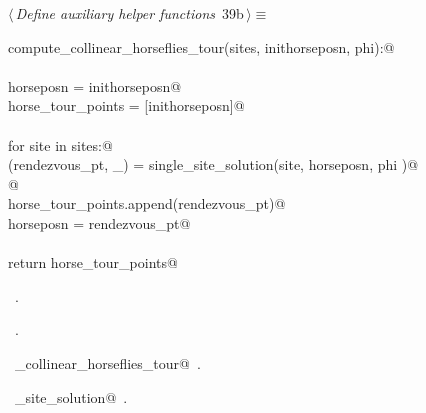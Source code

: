 \documentclass[11.5pt]{report}
\begin{document}

\begin{flushleft} \small
\begin{minipage}{\linewidth}\label{scrap53}\raggedright\small
{} $\langle\,${\itshape Define auxiliary helper functions}\nobreak\ {\footnotesize {39b}}$\,\rangle\equiv$
\vspace{-1ex}
\begin{list}{}{} \item
\mbox{}\verb@def compute_collinear_horseflies_tour(sites, inithorseposn, phi):@\\
\mbox{}\verb@@\\
\mbox{}\verb@      horseposn         = inithorseposn@\\
\mbox{}\verb@      horse_tour_points = [inithorseposn]@\\
\mbox{}\verb@@\\
\mbox{}\verb@      for site in sites:@\\
\mbox{}\verb@          (rendezvous_pt, _) = single_site_solution(site, horseposn, phi )@\\
\mbox{}\verb@            @\\
\mbox{}\verb@          horse_tour_points.append(rendezvous_pt)@\\
\mbox{}\verb@          horseposn = rendezvous_pt@\\
\mbox{}\verb@@\\
\mbox{}\verb@      return horse_tour_points@\\
\mbox{}\verb@@{\NWsep}
\end{list}
\vspace{-1.5ex}
\footnotesize
\begin{list}{}{\setlength{\itemsep}{-\parsep}\setlength{\itemindent}{-\leftmargin}}
\item \NWtxtMacroDefBy\ .
\item \NWtxtMacroRefIn\ .
\item \NWtxtIdentsDefed\nobreak\  \verb@compute_collinear_horseflies_tour@\nobreak\ .\item \NWtxtIdentsUsed\nobreak\  \verb@single_site_solution@\nobreak\ .
\item{}
\end{list}
\end{minipage}\vspace{4ex}
\end{flushleft}
\end{document}
